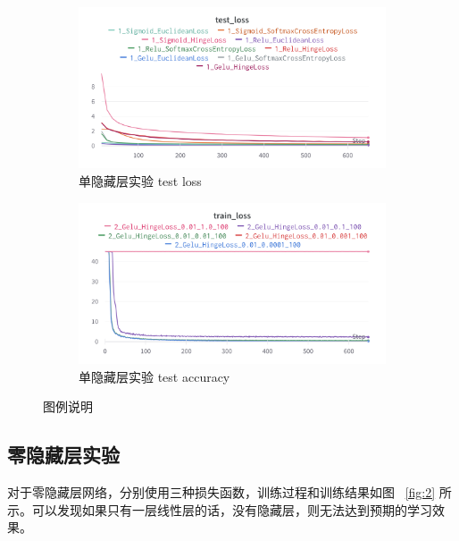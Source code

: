 \documentclass{article}
\begin{document}
\begin{figure}[htbp]
	\centering
	\begin{subfigure}{0.475\textwidth}
		\centering
		\includegraphics[width=1\textwidth]{../pics/单层实验-test_loss.png}
		\caption{单隐藏层实验 test loss}
	\end{subfigure}
	\begin{subfigure}{0.475\textwidth}
		\centering
		\includegraphics[width=1\textwidth]{../pics/消减率_2_Gelu_HingeLoss_train_loss.png}
		\caption{单隐藏层实验 test accuracy}
	\end{subfigure}
\caption{图例说明}
\label{fig:1}
\end{figure}

\subsection{零隐藏层实验}

对于零隐藏层网络，分别使用三种损失函数，训练过程和训练结果如图 ~\ref{fig:2} 所示。可以发现如果只有一层线性层的话，没有隐藏层，则无法达到预期的学习效果。
\end{document}

